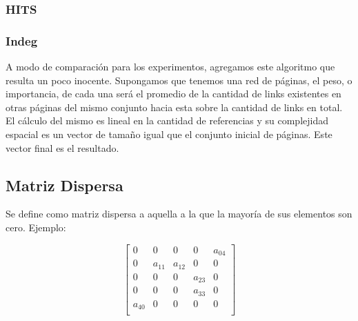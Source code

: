 \subsubsection{HITS}

\subsubsection{Indeg}
A modo de comparación para los experimentos, agregamos este algoritmo que resulta un poco inocente. Supongamos que tenemos una red de páginas, el peso, o importancia, de cada una será el promedio de la cantidad de links existentes en otras páginas del mismo conjunto hacia esta sobre la cantidad de links en total. El cálculo del mismo es lineal en la cantidad de referencias y su complejidad espacial es un vector de tamaño igual que el conjunto inicial de páginas. Este vector final es el resultado.

\subsection{Matriz Dispersa}
   Se define como matriz dispersa a aquella a la que la mayoría de sus elementos son cero.
   Ejemplo:

   $$ 
\begin{bmatrix}
       0    &      0    &   0       &   0           &   a_{04}    \\
       0    &   a_{11}  &   a_{12}  &   0           &   0    \\
       0    &      0    &   0       &   a_{23}      &   0    \\
       0    &      0    &   0       &   a_{33}      &   0    \\
  a_{40}    &      0    &   0       &   0           &   0    \\
\end{bmatrix} 
$$

